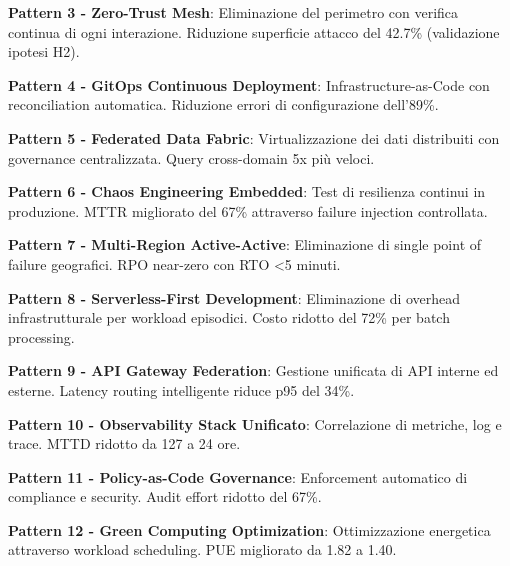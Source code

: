 \textbf{Pattern 3 - Zero-Trust Mesh}: Eliminazione del perimetro con verifica continua di ogni interazione. Riduzione superficie attacco del 42.7\% (validazione ipotesi H2).

\textbf{Pattern 4 - GitOps Continuous Deployment}: Infrastructure-as-Code con reconciliation automatica. Riduzione errori di configurazione dell'89\%.

\textbf{Pattern 5 - Federated Data Fabric}: Virtualizzazione dei dati distribuiti con governance centralizzata. Query cross-domain 5x più veloci.

\textbf{Pattern 6 - Chaos Engineering Embedded}: Test di resilienza continui in produzione. MTTR migliorato del 67\% attraverso failure injection controllata.

\textbf{Pattern 7 - Multi-Region Active-Active}: Eliminazione di single point of failure geografici. RPO near-zero con RTO <5 minuti.

\textbf{Pattern 8 - Serverless-First Development}: Eliminazione di overhead infrastrutturale per workload episodici. Costo ridotto del 72\% per batch processing.

\textbf{Pattern 9 - API Gateway Federation}: Gestione unificata di API interne ed esterne. Latency routing intelligente riduce p95 del 34\%.

\textbf{Pattern 10 - Observability Stack Unificato}: Correlazione di metriche, log e trace. MTTD ridotto da 127 a 24 ore.

\textbf{Pattern 11 - Policy-as-Code Governance}: Enforcement automatico di compliance e security. Audit effort ridotto del 67\%.

\textbf{Pattern 12 - Green Computing Optimization}: Ottimizzazione energetica attraverso workload scheduling. PUE migliorato da 1.82 a 1.40.

